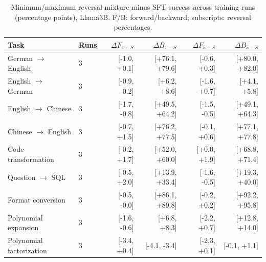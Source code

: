 \begin{table}[t]\centering\small
\begin{tabular}{llrrrr}\toprule
Task & Runs & $\Delta F_{1-S}$ & $\Delta B_{1-S}$ & $\Delta F_{5-S}$ & $\Delta B_{5-S}$ \\\midrule
German $\to$ English & 3 & [-1.0, +0.1] & [+76.1, +79.6] & [-0.6, +0.3] & [+80.0, +82.0] \\
English $\to$ German & 3 & [-0.9, -0.2] & [+6.2, +8.6] & [-1.6, +0.7] & [+4.1, +5.8] \\
English $\to$ Chinese & 3 & [-1.7, -0.8] & [+49.5, +64.2] & [-1.5, -0.5] & [+49.1, +64.3] \\
Chinese $\to$ English & 3 & [-0.7, +1.5] & [+76.2, +77.5] & [-0.1, +0.6] & [+77.1, +77.8] \\
Code transformation & 3 & [-0.2, +1.7] & [+52.0, +60.0] & [+0.0, +1.9] & [+68.8, +71.4] \\
Question $\to$ SQL & 3 & [-0.5, +2.0] & [+13.9, +33.4] & [-1.6, -0.5] & [+19.3, +40.0] \\
Format conversion & 3 & [-0.5, -0.0] & [+86.1, +89.8] & [-0.2, +0.2] & [+92.2, +95.8] \\
Polynomial expansion & 3 & [-1.6, -0.6] & [+6.8, +8.3] & [-2.2, +0.7] & [+12.8, +14.0] \\
Polynomial factorization & 3 & [-3.4, +0.4] & [-4.1, -3.4] & [-2.3, +0.1] & [-0.1, +1.1] \\
\bottomrule\end{tabular}
\caption{Minimum/maximum reversal-mixture minus SFT success across training runs (percentage points), Llama3B. F/B: forward/backward; subscripts: reversal percentages.}\label{tab:main-seed-variation}\end{table}
